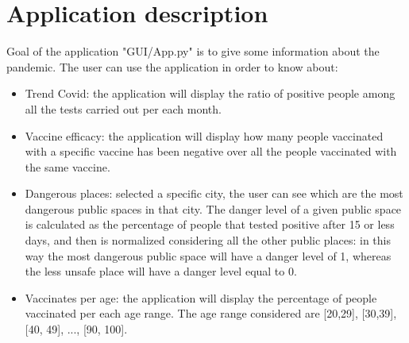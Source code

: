 \documentclass{article}
\begin{document}
\section{Application description}
Goal of the application {\selectfont"GUI/App.py"} is to give some information about the pandemic.
The user can use the application in order to know about:
\begin{itemize}
    \item Trend Covid: the application will display the ratio of positive people among all the tests carried out per each month.
    \item Vaccine efficacy: the application will display how many people vaccinated with a specific vaccine has been negative over all
    the people vaccinated with the same vaccine.
    \item Dangerous places: selected a specific city, the user can see which are the most dangerous public spaces in that city. The danger level of
    a given public space is calculated as the percentage of people that tested positive after 15 or less days, and then is normalized considering
    all the other public places: in this way the most dangerous public space will have a danger level of 1,
    whereas the less unsafe place will have a danger level equal to 0.
    \item Vaccinates per age: the application will display the percentage of people vaccinated per each age range.
    The age range considered are [20,29], [30,39], [40, 49], ..., [90, 100].
\end{itemize}
\end{document}
